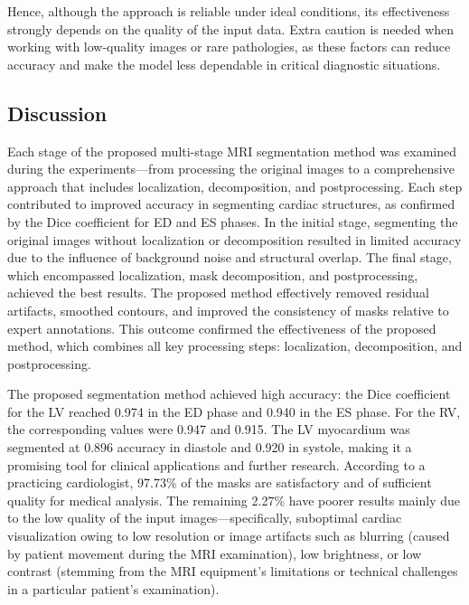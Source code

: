 \documentclass[fleqn,10pt]{wlscirep}
\begin{document}
Hence, although the approach is reliable under ideal conditions, its effectiveness strongly depends on the quality of the input data. Extra caution is needed when working with low-quality images or rare pathologies, as these factors can reduce accuracy and make the model less dependable in critical diagnostic situations.

\subsection*{Discussion}

Each stage of the proposed multi-stage MRI segmentation method was examined during the experiments—from processing the original images to a comprehensive approach that includes localization, decomposition, and postprocessing. Each step contributed to improved accuracy in segmenting cardiac structures, as confirmed by the Dice coefficient for ED and ES phases. In the initial stage, segmenting the original images without localization or decomposition resulted in limited accuracy due to the influence of background noise and structural overlap. The final stage, which encompassed localization, mask decomposition, and postprocessing, achieved the best results. The proposed method effectively removed residual artifacts, smoothed contours, and improved the consistency of masks relative to expert annotations. This outcome confirmed the effectiveness of the proposed method, which combines all key processing steps: localization, decomposition, and postprocessing.

The proposed segmentation method achieved high accuracy: the Dice coefficient for the LV reached 0.974 in the ED phase and 0.940 in the ES phase. For the RV, the corresponding values were 0.947 and 0.915. The LV myocardium was segmented at 0.896 accuracy in diastole and 0.920 in systole, making it a promising tool for clinical applications and further research. According to a practicing cardiologist, 97.73\% of the masks are satisfactory and of sufficient quality for medical analysis. The remaining 2.27\% have poorer results mainly due to the low quality of the input images—specifically, suboptimal cardiac visualization owing to low resolution or image artifacts such as blurring (caused by patient movement during the MRI examination), low brightness, or low contrast (stemming from the MRI equipment’s limitations or technical challenges in a particular patient’s examination).
\end{document}
